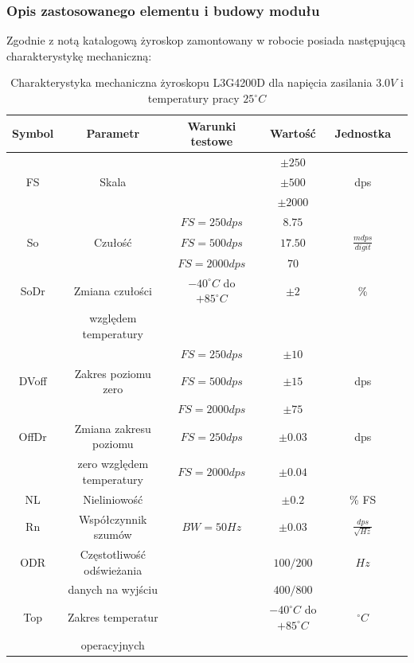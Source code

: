 \subsubsection{Opis zastosowanego elementu i budowy modułu}
Zgodnie z notą katalogową żyroskop zamontowany w robocie posiada następującą charakterystykę mechaniczną:
\begin{table}[hb]
\centering
\caption{Charakterystyka mechaniczna żyroskopu L3G4200D dla napięcia zasilania $3.0V$ i temperatury pracy $25^{\circ}C$}
   	\begin{tabular}{ | c | c | c | c | c | p{1.75cm} |} \hline
   		Symbol & Parametr & Warunki testowe & Wartość & Jednostka \\ \hline
   		& & & $\pm 250$ & \\
   		FS & Skala & & $\pm 500$ & dps\\
   		& & & $\pm 2000$ & \\ \hline
   		& & $FS = 250 dps$  & $8.75$  & \\
   		So  & Czułość & $FS = 500 dps$ & $17.50$  & $\frac{mdps}{digit}$ \\
   		& & $FS = 2000 dps$  & $70$  & \\ \hline
   		SoDr & Zmiana czułości & $-40^{\circ}C$ do $+85^{\circ}C$ & $\pm 2$  & \% \\
		& względem temperatury & & &  \\ \hline
		& & $FS = 250 dps$ & $\pm 10$  &  \\
   		DVoff & Zakres poziomu zero & $FS = 500 dps$  & $\pm 15$ & dps \\
   		& & $FS = 2000 dps$ & $\pm 75$ & \\ \hline
   		OffDr & Zmiana zakresu poziomu & $FS = 250 dps$  & $\pm 0.03$ & dps \\
   		& zero względem temperatury & $FS = 2000 dps$ & $\pm 0.04$ & \\ \hline
		NL & Nieliniowość & & $\pm 0.2$ & \% FS \\ \hline
		Rn & Współczynnik szumów & $BW = 50 Hz$ & $\pm 0.03$ & $\frac{dps}{\sqrt{Hz}}$ \\ \hline
		ODR & Częstotliwość odświeżania & & $100/200$ & $Hz$ \\
		& danych na wyjściu & & $400/800$ & \\ \hline
		Top & Zakres temperatur & & $-40^{\circ} C$ do $+85^{\circ} C$ & $^{\circ} C$ \\
		& operacyjnych & & & \\ \hline
   	\end{tabular}
\label{ObstacleAvoidTable}
\end{table}
